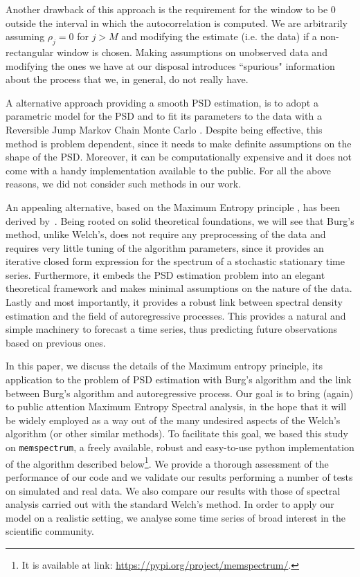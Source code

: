 \documentclass{aa}
\begin{document}
Another drawback of this approach is the requirement for the window to be $0$ outside the interval in which the autocorrelation is computed.
We are arbitrarily assuming $\rho_j = 0$ for $j > M$ and modifying the estimate (i.e. the data) if a non-rectangular window is chosen.
Making assumptions on unobserved data and modifying the ones we have at our disposal introduces ``spurious" information about the process that we, in general, do not really have.

A alternative approach providing a smooth PSD estimation, is to adopt a parametric model for the PSD and to fit its parameters to the data with a Reversible Jump Markov Chain Monte Carlo \citep[e.g.]{Cornish_2015, Littenberg_2015}. Despite being effective, this method is problem dependent, since it needs to make definite assumptions on the shape of the PSD. Moreover, it can be computationally expensive and it does not come with a handy implementation available to the public. For all the above reasons, we did not consider such methods in our work.

An appealing alternative, based on the Maximum Entropy principle \citep{JaynesArticle,jaynes2003ptl, Jaynes_MAXENT}, has been derived by~\citet{burg1975maximum}. Being rooted on solid theoretical foundations, we will see that Burg's method, unlike Welch's, does not require any preprocessing of the data and requires very little tuning of the algorithm parameters, since it provides an iterative closed form expression for the spectrum of a stochastic stationary time series. Furthermore, it embeds the PSD estimation problem into an elegant theoretical framework and makes minimal assumptions on the nature of the data.
Lastly and most importantly, it provides a robust link between spectral density estimation and the field of autoregressive processes. This provides a natural and simple machinery to forecast a time series, thus predicting future observations based on previous ones.

In this paper, we discuss the details of the Maximum entropy principle, its application to the problem of PSD estimation with Burg's algorithm and the link between Burg's algorithm and autoregressive process.
Our goal is to bring (again) to public attention Maximum Entropy Spectral analysis, in the hope that it will be widely employed as a way out of the many undesired aspects of the Welch's algorithm (or other similar methods).
To facilitate this goal, we based this study on \texttt{memspectrum}, a freely available, robust and easy-to-use python implementation of the algorithm described below\footnote{
It is available at link: \url{https://pypi.org/project/memspectrum/}.}.
We provide a thorough assessment of the performance of our code and we validate our results performing a number of tests on simulated and real data.
We also compare our results with those of spectral analysis carried out with the standard Welch's method.
In order to apply our model on a realistic setting, we analyse some time series of broad interest in the scientific community.
\end{document}
